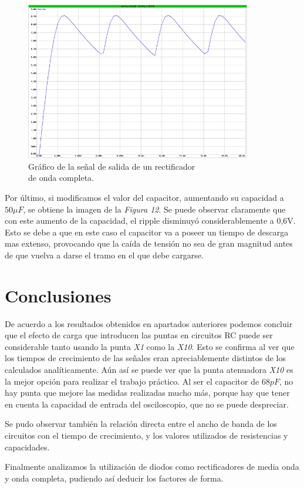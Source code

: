 \documentclass{article}
\begin{document}
\begin{figure}[h]
	\centering
	\includegraphics[width=0.88\textwidth]{images/4-4-8-grafico-circuito-rectificador-onda-completa-con-filtro.jpg}
	\medskip
	\caption{Gráfico de la señal de salida de un rectificador\\ de onda completa.}
\end{figure}
\bigskip\bigskip


	Por último, si modificamos el valor del capacitor, aumentando su capacidad a $50\mu F$, se obtiene la imagen de la \textit{Figura 12}. Se puede observar claramente que con este aumento de la capacidad, el ripple disminuyó considerablemente a 0,6V. Esto se debe a que en este caso el capacitor va a poseer un tiempo de descarga mas extenso, provocando que la caída de tensión no sea de gran magnitud antes de que vuelva a darse el tramo en el que debe cargarse. 
\bigskip\bigskip




\section{Conclusiones}

	De acuerdo a los resultados obtenidos en apartados anteriores podemos concluir que el efecto de carga que introducen las puntas en circuitos RC puede ser considerable tanto usando la punta \textit{X1} como la \textit{X10}. Esto se confirma al ver que los tiempos de crecimiento de las señales eran apreciablemente distintos de los calculados analíticamente. Aún así se puede ver que la punta atenuadora \textit{X10} es la mejor opción para realizar el trabajo práctico. Al ser el capacitor de $68 pF$, no hay punta que mejore las medidas realizadas mucho más, porque hay que tener en cuenta la capacidad de entrada del osciloscopio, que no se puede despreciar. 
	\par
	Se pudo observar también la relación directa entre el ancho de banda de los circuitos con el tiempo de crecimiento, y los valores utilizados de resistencias y capacidades. 
	\par
	Finalmente analizamos la utilización de diodos como rectificadores de media onda y onda completa, pudiendo así deducir los factores de forma.
\bigskip\bigskip
\end{document}
